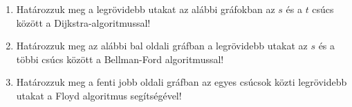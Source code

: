 \documentclass[a4paper,12pt]{article}
\begin{document}
    \noindent{}
    \noindent{}
    \begin{enumerate}

        \item Határozzuk meg a legrövidebb utakat az alábbi gráfokban az $s$ és a $t$ csúcs között a Dijkstra-algoritmussal!
        \begin{figure}[!h]
            \centering \hfill
            \hfill
            \hfill \hfill
        \end{figure}

        \item Határozzuk meg az alábbi bal oldali gráfban a legrövidebb utakat az $s$ és a többi csúcs között a Bellman-Ford algoritmussal!
        \begin{figure}[h]
            \centering
            \begin{subfigure}{0.4\textwidth}
                \centering
                
            \end{subfigure}
            \begin{subfigure}{0.4\textwidth}
                \centering
                
            \end{subfigure}
        \end{figure}
        
        \item Határozzuk meg a fenti jobb oldali gráfban az egyes csúcsok közti legrövidebb utakat a Floyd algoritmus segítségével!
        

\end{enumerate}
\end{document}
